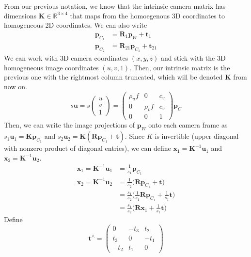 \documentclass{article}
\begin{document}
  From our previous notation, we know that the intrinsic camera matrix has dimensions $\mathbf{K} \in \mathbb{R}^{3 \times 4}$ that maps from the homoegenous 3D coordinates to homogeneous 2D coordinates. We can also write 
  \begin{align*}
      \mathbf{p}_{C_1} & = \mathbf{R}_1 \mathbf{p}_W + \mathbf{t}_1 \\ 
      \mathbf{p}_{C_2} & = \mathbf{R}_{21} \mathbf{p}_{C_1} + \mathbf{t}_{21}
  \end{align*}
  We can work with 3D camera coordinates $(x, y, z)$ and stick with the 3D homogeneous image coordinates $(u, v, 1)$. Then, our intrinsic matrix is the previous one with the rightmost column truncated, which will be denoted $\mathbf{K}$ from now on. 
  \begin{equation}
    s \mathbf{u} = s \begin{pmatrix} u \\ v \\ 1 \end{pmatrix} = \begin{pmatrix} \rho_u f & 0 & c_v \\ 0 & \rho_v f & c_v \\ 0 & 0 & 1 \end{pmatrix} \mathbf{p}_C
  \end{equation}
  Then, we can write the image projections of $\mathbf{p}_W$ onto each camera frame as $s_1 \mathbf{u}_1 = \mathbf{K} \mathbf{p}_{C_1}$ and $s_2 \mathbf{u}_2 = \mathbf{K} (\mathbf{R} \mathbf{p}_{C_1} + \mathbf{t})$. Since $K$ is invertible (upper diagonal with nonzero product of diagonal entries), we can define $\mathbf{x}_1 = \mathbf{K}^{-1} \mathbf{u}_1$ and $\mathbf{x}_2 = \mathbf{K}^{-1} \mathbf{u}_2$. 
  \begin{align*}
      \mathbf{x}_1 = \mathbf{K}^{-1} \mathbf{u}_1 & = \frac{1}{s_1} \mathbf{p}_{C_1} \\ 
      \mathbf{x}_2 = \mathbf{K}^{-1} \mathbf{u}_2 & = \frac{1}{s_2} \big( \mathbf{R} \mathbf{p}_{C_1} + \mathbf{t} \big) \\
      & = \frac{s_1}{s_2} \bigg( \frac{1}{s_1} \mathbf{R} \mathbf{p}_{C_1} + \frac{1}{s_1} \mathbf{t} \bigg) \\
      & = \frac{s_1}{s_2} \big( \mathbf{R} \mathbf{x}_1 + \frac{1}{s_1} \mathbf{t} \big) 
  \end{align*}
  Define 
  \begin{equation}
    \mathbf{t}^\wedge = \begin{pmatrix} 0 & -t_3 & t_2 \\ t_3 & 0 & -t_1 \\ -t_2 & t_1 & 0 \end{pmatrix}
  \end{equation}
\end{document}
